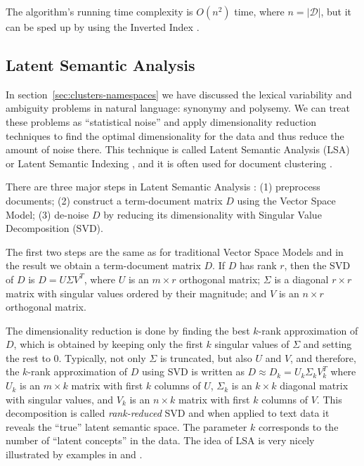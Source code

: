The algorithm's running time complexity is $O(n^2)$ time, where $n = |\mathcal D|$,
but it can be sped up by using the Inverted Index \cite{ertoz2003finding}.


\subsection{Latent Semantic Analysis} \label{sec:lsa}

In section~\ref{sec:clusters-namespaces} we have discussed the
lexical variability and ambiguity problems in natural language: synonymy
and polysemy. We can treat these problems as ``statistical noise'' and
apply dimensionality reduction techniques to find the optimal dimensionality
for the data and thus reduce the amount of noise there.
This technique is called Latent Semantic Analysis (LSA) \cite{landauer1998introduction}
or Latent Semantic Indexing \cite{deerwester1990indexing}, and
it is often used for document clustering \cite{aggarwal2012survey} \cite{osinski2004lingo}.

There are three major steps in Latent Semantic Analysis  \cite{evangelopoulos2012latent}:
(1) preprocess documents;
(2) construct a term-document matrix $D$ using the Vector Space Model;
(3) de-noise $D$ by reducing its dimensionality with Singular Value Decomposition (SVD).

The first two steps are the same as for traditional Vector Space Models
and in the result we obtain a term-document matrix $D$.
If $D$ has rank $r$, then the SVD of $D$ is $D = U  \Sigma V^T$, where
$U$ is an $m \times r$ orthogonal matrix;
$\Sigma$ is a diagonal $r \times r$ matrix with singular values ordered by their magnitude;
and $V$ is an $n \times r$ orthogonal matrix.

The dimensionality reduction is done by finding the best $k$-rank approximation
of $D$, which is obtained by keeping only the first $k$ singular values of $\Sigma$
and setting the rest to 0.
Typically, not only $\Sigma$ is truncated, but also $U$ and $V$,
and therefore, the $k$-rank approximation of $D$ using SVD is written as
$D \approx D_k = U_k \Sigma_k V_k^T$ where $U_k$ is an $m \times k$
matrix with first $k$ columns of $U$, $\Sigma_k$ is an $k \times k$
diagonal matrix with singular values, and $V_k$ is an $n \times k$
matrix with first $k$ columns of $V$.  This decomposition
is called \emph{rank-reduced} SVD and when applied to text data
it reveals the ``true'' latent semantic space. The parameter $k$ corresponds
to the number of ``latent concepts'' in the data. The idea
of LSA is very nicely illustrated by examples  in
\cite{deerwester1990indexing} and \cite{landauer1998introduction}.

